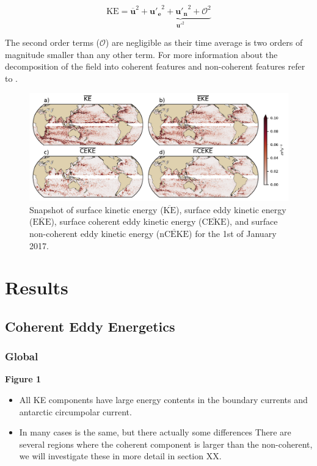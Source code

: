 \documentclass[draft,linenumbers]{agujournal2019}
\newcommand{\MKE}{\overline{\textrm{KE}}}
\newcommand{\MEKE}{\overline{\textrm{EKE}}}
\newcommand{\MCEKE}{\overline{\textrm{CEKE}}}
\newcommand{\MnCEKE}{\overline{\textrm{nCEKE}}}
\begin{document}
	\begin{equation}
		\mathrm{KE}= \mathbf{\overline{u}}^2 +\underbrace{ \mathbf{u'_e}^2+ \mathbf{u'_n}^2 + \mathcal{O}^2}_{\mathbf{u'}^2}
	\end{equation}
	
	The second order terms ($\mathcal{O}$) are negligible as their time average is two orders of magnitude smaller than any other term. For more information about the decomposition of the field into coherent features and non-coherent features refer to \citet{Martinez_Kinetic_2019}.

	\begin{figure}
	    \centering
	    \includegraphics[width=1\textwidth]{figures/snapshot_ke_maps_satellite.pdf}
	    \caption{Snapshot of surface kinetic energy ($\MKE$), surface eddy kinetic energy ($\MEKE$), surface coherent eddy kinetic energy ($\MCEKE$), and surface non-coherent eddy kinetic energy ($\MnCEKE$) for the 1st of January 2017.}
	    \label{fig:eddy_snapshot}
	\end{figure}



	\section{Results}
	\label{sec:Results}
	
	\subsection{Coherent Eddy Energetics}
	\label{subsec:R_season}
	
	\subsubsection{Global}


	\textbf{Figure 1}
	\begin{itemize}
		\item All KE components have large energy contents in the boundary currents and antarctic circumpolar current. 
		\item In many cases is the same, but there actually some differences There are several regions where the coherent component is larger than the non-coherent, we will investigate these in more detail in section XX.
	\end{itemize}
\end{document}
